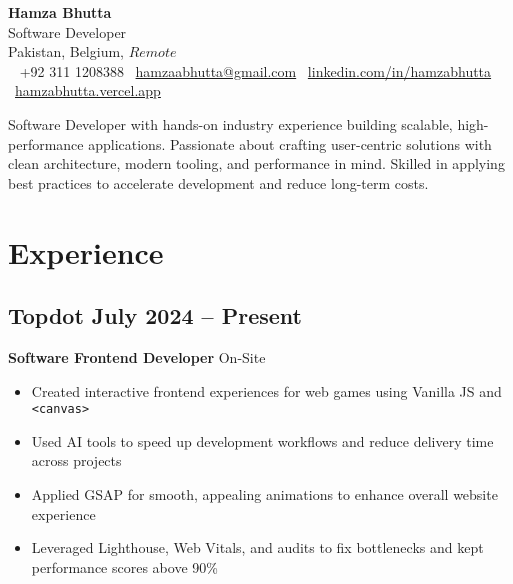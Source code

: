 \documentclass[11pt]{article}
\makeatletter
\newcommand{\bodyfontsize}{\small} %
\newcommand{\headerfontsize}{\huge} %
\newcommand{\resumeHeader}[6]{ %
    \begin{center}
        \vspace*{10pt}
        {\headerfontsize\bfseries\color{headercolor} #1} \\[8pt]
      {\large\color{headercolor} Software Developer} \\[4pt]
{\bodyfontsize\color{headercolor} #6} \\[8pt]
        {\normalsize\color{headercolor}
            \faPhone~ {+92 311 1208388} {}
            \faEnvelope~\href{mailto:hamzaabhutta@gmail.com}{hamzaabhutta@gmail.com}  {}
            \faLinkedin~\href{https://www.linkedin.com/in/hamzabhutta}{linkedin.com/in/hamzabhutta} {}
            \faGlobe~\href{https://hamzabhutta.vercel.app/}{hamzabhutta.vercel.app}
        } \\[10pt]
        \parbox{0.9\textwidth}{\centering\small\color{black}#5} %
        \vspace{10pt}
    \end{center}
}
\makeatother
\begin{document}
\pagestyle{empty} %
\RaggedRight %

\resumeHeader{Hamza Bhutta}{}{}{}{
Software Developer with hands-on industry experience building scalable, high-performance applications. Passionate about crafting user-centric solutions with clean architecture, modern tooling, and performance in mind. Skilled in applying best practices to accelerate development and reduce long-term costs.
}
{Pakistan, Belgium, \(Remote\)}


\section{Experience}
\subsection{\texorpdfstring{Topdot \hfill July 2024 -- Present}{Topdot, July 2024 -- Present}}  
\textbf{Software Frontend Developer} \hfill On-Site  
\begin{itemize}
\item Created interactive frontend experiences for web games using Vanilla JS and \texttt{<canvas>}
\item Used AI tools to speed up development workflows and reduce delivery time across projects  
\item Applied GSAP for smooth, appealing animations to enhance overall website experience  
\item Leveraged Lighthouse, Web Vitals, and audits to fix bottlenecks and kept performance scores above 90\%  
\end{itemize}
\end{document}

